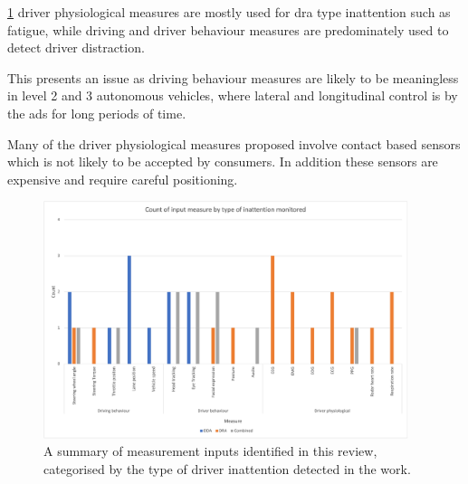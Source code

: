 \documentclass[11pt, parskip=half*,twoside=false]{scrbook}
\begin{document}
\cref{fig:summary} driver physiological measures are mostly used for \gls{dra} type inattention such as fatigue, while driving and driver behaviour measures are predominately used to detect driver distraction.

This presents an issue as driving behaviour measures are likely to be meaningless in level 2 and 3 autonomous vehicles, where lateral and longitudinal control is by the \gls{ads} for long periods of time. 

Many of the driver physiological measures proposed involve contact based sensors which is not likely to be accepted by consumers. In addition these sensors are expensive and require careful positioning.

\begin{figure} 
	\centering
	\includegraphics[width=0.95\textwidth]{summary_graph} 
	\caption{A summary of measurement inputs identified in this review, categorised by the type of driver inattention detected in the work.}
	\label{fig:summary}
\end{figure}

%
% 
\end{document}
